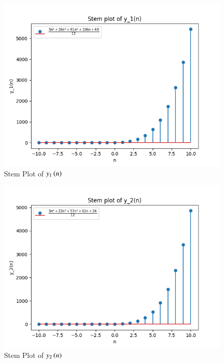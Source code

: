 \documentclass[journal,12pt,twocolumn]{IEEEtran}
\theoremstyle{remark}
\begin{document}
\begin{figure}[htbp]
    \centering
    \includegraphics[width=1\columnwidth]{figs/y1_plot.png}
    \caption{Stem Plot of $y_1\left(n\right)$}
    \label{fig:y1}
\end{figure}

\begin{figure}[htbp]
    \centering
    \includegraphics[width=1\columnwidth]{figs/y2_plot.png}
    \caption{Stem Plot of $y_2\left(n\right)$}
    \label{fig:y2}
\end{figure}
\end{document}
